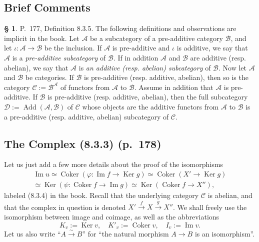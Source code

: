\documentclass[12pt]{article}%
\theoremstyle{remark}
\theoremstyle{definition}
\newtheorem{s}[thm]{\S}%
\newcommand{\cc}{\mathcal}
\newcommand{\C}{\mathcal C}
\newcommand{\pp}{\varphi}
\DeclareMathOperator{\Ad}{Add}
\DeclareMathOperator{\Coker}{Coker}
\DeclareMathOperator{\Ima}{Im}
\DeclareMathOperator{\Ker}{Ker}
\begin{document}

\subsection{Brief Comments}

\begin{s} 
P.~177, Definition 8.3.5. The following definitions and observations are implicit in the book. Let $\cc A$ be a subcategory of a pre-additive category $\cc B$, and let $\iota:\cc A\to \cc B$ be the inclusion. If $\cc A$ is pre-additive and $\iota$ is additive, we say that $\cc A$ is a {\em pre-additive subcategory} of $\cc B$. If in addition $\cc A$ and $\cc B$ are additive (resp. abelian), we say that $\cc A$ is {\em an additive (resp. abelian) subcategory} of $\cc B$. Now let $\cc A$ and $\cc B$ be categories. If $\cc B$ is pre-additive (resp. additive, abelian), then so is the category $\cc C:=\cc B^\cc A$ of functors from $\cc A$ to $\cc B$. Assume in addition that $\cc A$ is pre-additive. If $\cc B$ is pre-additive (resp. additive, abelian), then the full subcategory $\cc D:=\Ad(\cc A,\cc B)$ of $\cc C$ whose objects are the additive functors from $\cc A$ to $\cc B$ is a pre-additive (resp. additive, abelian) subcategory of $\cc C$.
\end{s}
%
\subsection{The Complex (8.3.3) (p.~178)}
%
Let us just add a few more details about the proof of the isomorphisms
\begin{equation}\label{834}
\begin{split}
\Ima u\simeq\Coker(\pp:\Ima f\to\Ker g)\simeq\Coker(X'\to\Ker g)\\ 
\simeq\Ker(\psi:\Coker f\to\Ima g)\simeq\Ker(\Coker f\to X''),
\end{split}
\end{equation}
labeled (8.3.4) in the book. Recall that the underlying category $\C$ is abelian, and that the complex in question is denoted $X'\xrightarrow{f}X\xrightarrow{g}X''$. We shall freely use the isomorphism between image and coimage, as well as the abbreviations 
$$
K_v:=\Ker v,\quad K'_v:=\Coker v,\quad I_v:=\Ima v.
$$ 
Let us also write ``$A\overset{\sim}{\to}B$'' for ``the natural morphism $A\to B$ is an isomorphism''. 
\end{document}
